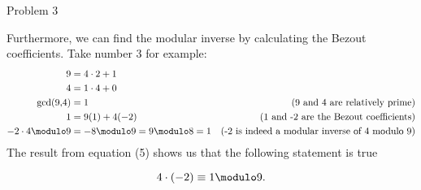 \begin{problem}{Problem 3}
\begin{Highlight}[Synopsis]
        Furthermore, we can find the modular inverse by calculating the Bezout coefficients. Take number 3 for example:
        \begin{align}
            9 & = 4 \cdot 2 + 1 & \\
            4 & = 1 \cdot 4 + 0 & \\
            \text{gcd(9,4)} & = 1 & \text{(9 and 4 are relatively prime)} \\
            1 & = 9(1) + 4(-2) & \text{(1 and -2 are the Bezout coefficients)} \\
            -2 \cdot 4 \modulo 9 & = -8 \modulo 9 = 9 \modulo 8 = 1 & \text{(-2 is indeed a modular inverse of 4 modulo 9)}
        \end{align}
        The result from equation (5) shows us that the following statement is true

        \begin{equation*}
            4 \cdot (-2) \equiv 1 \modulo 9.
        \end{equation*}
    \end{Highlight}
\end{problem}

